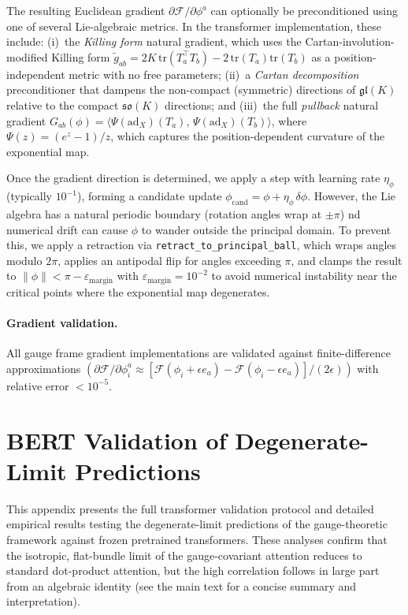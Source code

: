 \documentclass[twoside,11pt]{article}
\begin{document}
The resulting Euclidean gradient $\partial\mathcal{F}/\partial\phi^a$ can optionally be preconditioned using one of several Lie-algebraic metrics.  In the transformer implementation, these include: (i)~the \emph{Killing form} natural gradient, which uses the Cartan-involution-modified Killing form $\tilde{g}_{ab} = 2K\,\mathrm{tr}(T_a^\top T_b) - 2\,\mathrm{tr}(T_a)\mathrm{tr}(T_b)$ as a position-independent metric with no free parameters; (ii)~a \emph{Cartan decomposition} preconditioner that dampens the non-compact (symmetric) directions of $\mathfrak{gl}(K)$ relative to the compact $\mathfrak{so}(K)$ directions; and (iii)~the full \emph{pullback} natural gradient $G_{ab}(\phi) = \langle \Psi(\mathrm{ad}_X)(T_a),\, \Psi(\mathrm{ad}_X)(T_b) \rangle$, where $\Psi(z) = (e^z - 1)/z$, which captures the position-dependent curvature of the exponential map.

Once the gradient direction is determined, we apply a step with learning rate $\eta_\phi$ (typically $10^{-1}$), forming a candidate update $\phi_{\text{cand}} = \phi + \eta_\phi\,\delta \phi$. However, the Lie algebra has a natural periodic boundary (rotation angles wrap at $\pm \pi$) nd numerical drift can cause $\phi$ to wander outside the principal domain. To prevent this, we apply a retraction via \texttt{retract\_to\_principal\_ball}, which wraps angles modulo $2\pi$, applies an antipodal flip for angles exceeding $\pi$, and clamps the result to $\|\phi\| < \pi - \varepsilon_{\mathrm{margin}}$ with $\varepsilon_{\mathrm{margin}} = 10^{-2}$ to avoid numerical instability near the critical points where the exponential map degenerates.


\paragraph{Gradient validation.} All gauge frame gradient implementations are validated against finite-difference approximations $(\partial \mathcal{F}/\partial \phi_i^a \approx [\mathcal{F}(\phi_i + \epsilon e_a) - \mathcal{F}(\phi_i - \epsilon e_a)]/(2\epsilon))$ with relative error $< 10^{-5}$.


\section{BERT Validation of Degenerate-Limit Predictions}
\label{app:bert_validation}

This appendix presents the full transformer validation protocol and detailed empirical results testing the degenerate-limit predictions of the gauge-theoretic framework against frozen pretrained transformers. These analyses confirm that the isotropic, flat-bundle limit of the gauge-covariant attention reduces to standard dot-product attention, but the high correlation follows in large part from an algebraic identity (see the main text for a concise summary and interpretation).
\end{document}
